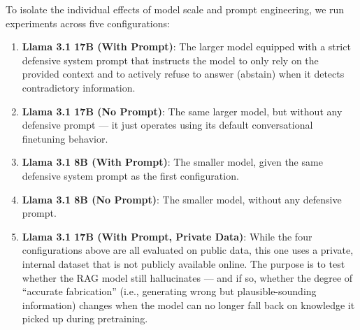 To isolate the individual effects of model scale and prompt engineering, we run experiments across five configurations:

\begin{enumerate}
\item \textbf{Llama 3.1 17B (With Prompt)}: The larger model equipped with a strict defensive system prompt that instructs the model to only rely on the provided context and to actively refuse to answer (abstain) when it detects contradictory information.
\item \textbf{Llama 3.1 17B (No Prompt)}: The same larger model, but without any defensive prompt --- it just operates using its default conversational finetuning behavior.
\item \textbf{Llama 3.1 8B (With Prompt)}: The smaller model, given the same defensive system prompt as the first configuration.
\item \textbf{Llama 3.1 8B (No Prompt)}: The smaller model, without any defensive prompt.
\item \textbf{Llama 3.1 17B (With Prompt, Private Data)}: While the four configurations above are all evaluated on public data, this one uses a private, internal dataset that is not publicly available online. The purpose is to test whether the RAG model still hallucinates --- and if so, whether the degree of ``accurate fabrication'' (i.e., generating wrong but plausible-sounding information) changes when the model can no longer fall back on knowledge it picked up during pretraining.
\end{enumerate}
